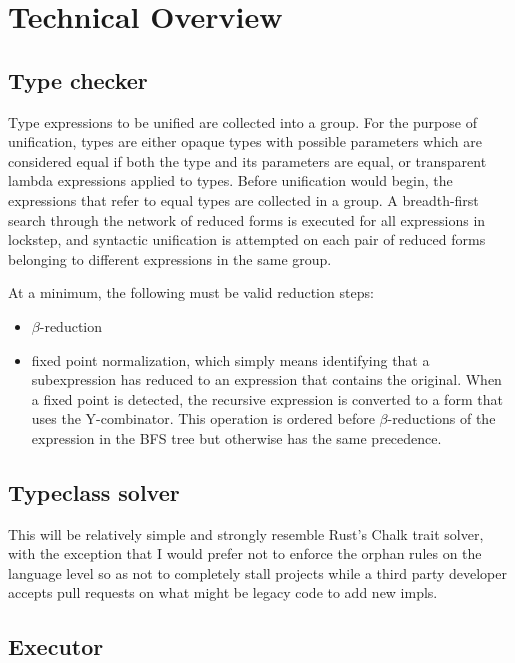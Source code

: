 \documentclass{article}
\begin{document}
\section{Technical Overview}

\subsection{Type checker}

Type expressions to be unified are collected into a group. For the purpose of unification, types
are either opaque types with possible parameters which are considered equal if both the type and its
parameters are equal, or transparent lambda expressions applied to types. Before unification would
begin, the expressions that refer to equal types are collected in a group. A breadth-first search
through the network of reduced forms is executed for all expressions in lockstep, and
syntactic unification is attempted on each pair of reduced forms belonging to different expressions
in the same group.

At a minimum, the following must be valid reduction steps:

\begin{itemize}
    \item $\beta$-reduction
    \item fixed point normalization, which simply means identifying that a subexpression has
        reduced to an expression that contains the original. When a fixed point is detected, the
        recursive expression is converted to a form that uses the Y-combinator. This operation
        is ordered before $\beta$-reductions of the expression in the BFS tree but otherwise has
        the same precedence.
\end{itemize}

\subsection{Typeclass solver}

This will be relatively simple and strongly resemble Rust's Chalk trait solver, with the exception
that I would prefer not to enforce the orphan rules on the language level so as not to completely
stall projects while a third party developer accepts pull requests on what might be legacy code to
add new impls.

\subsection{Executor}
\end{document}
